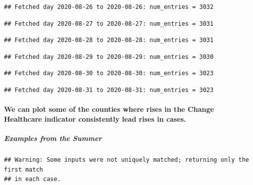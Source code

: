 \documentclass[]{article}
\let\oldparagraph\paragraph
\renewcommand{\paragraph}[1]{\oldparagraph{#1}\mbox{}}
\let\oldsubparagraph\subparagraph
\renewcommand{\subparagraph}[1]{\oldsubparagraph{#1}\mbox{}}
\begin{document}
\begin{verbatim}
## Fetched day 2020-08-26 to 2020-08-26: num_entries = 3032
\end{verbatim}

\begin{verbatim}
## Fetched day 2020-08-27 to 2020-08-27: num_entries = 3031
\end{verbatim}

\begin{verbatim}
## Fetched day 2020-08-28 to 2020-08-28: num_entries = 3031
\end{verbatim}

\begin{verbatim}
## Fetched day 2020-08-29 to 2020-08-29: num_entries = 3030
\end{verbatim}

\begin{verbatim}
## Fetched day 2020-08-30 to 2020-08-30: num_entries = 3023
\end{verbatim}

\begin{verbatim}
## Fetched day 2020-08-31 to 2020-08-31: num_entries = 3023
\end{verbatim}

\hypertarget{we-can-plot-some-of-the-counties-where-rises-in-the-change-healthcare-indicator-consistently-lead-rises-in-cases.}{%
\paragraph{We can plot some of the counties where rises in the Change
Healthcare indicator consistently lead rises in
cases.}\label{we-can-plot-some-of-the-counties-where-rises-in-the-change-healthcare-indicator-consistently-lead-rises-in-cases.}}

\hypertarget{examples-from-the-summer-1}{%
\subparagraph{Examples from the
Summer}\label{examples-from-the-summer-1}}

\begin{verbatim}
## Warning: Some inputs were not uniquely matched; returning only the first match
## in each case.
\end{verbatim}
\end{document}
